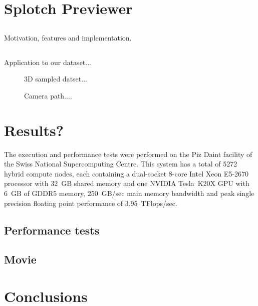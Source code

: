 \documentclass{egpubl}
\begin{document}
\section{Splotch Previewer}

\subsection{}
Motivation, features and implementation.

\subsection{}
Application to our dataset...

\begin{figure}[htb]
\centering
\caption{3D sampled datset...}
\label{fig:sample}
\end{figure}

\begin{figure}[htb]
\centering
\caption{Camera path....}
\label{fig:camera}
\end{figure}


\section{Results?}

The execution and performance tests were performed on the Piz Daint facility of the Swiss National Supercomputing Centre. 
This system has a total of 5272 hybrid compute nodes, each containing a dual-socket 8-core Intel Xeon E5-2670 processor with 32~GB shared memory and one NVIDIA Tesla~K20X GPU with 6~GB of GDDR5 memory, 250~GB/sec main memory bandwidth and peak single precision floating point performance of 3.95~TFlops/sec.

\subsection{Performance tests}

\subsection{Movie}

\section{Conclusions}

 


%



\end{document}

